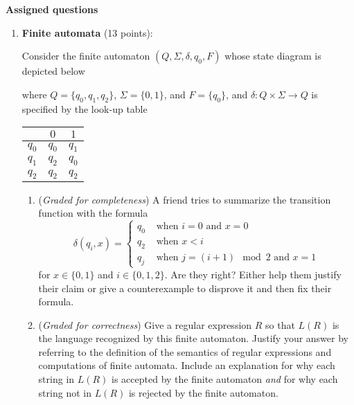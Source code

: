 \documentclass[12pt, oneside]{article}
\newcommand{\gradeCorrect}{({\it Graded for correctness}) }
\newcommand{\gradeComplete}{({\it Graded for completeness}) }
\begin{document}
{\bf Assigned questions}
\begin{enumerate}[wide, labelwidth=!, labelindent=0pt]
\item\textbf{Finite automata} (13 points):

Consider the finite automaton $(Q, \Sigma, \delta, q_0, F)$ whose state diagram is depicted below
\begin{center}
\end{center}
where $Q = \{q_0, q_1, q_2\}$, $\Sigma = \{0,1\}$, and $F = \{q_0\}$, and $\delta: Q \times \Sigma \to Q$
is specified by the look-up table
\begin{center}
\begin{tabular}{c|cc}
        & $0$ & $1$ \\
    \hline
  $q_0$ & $q_0$ & $q_1$ \\
  $q_1$ & $q_2$ & $q_0$ \\
  $q_2$ & $q_2$ & $q_2$
\end{tabular}
\end{center}
    \begin{enumerate}
    \item\gradeComplete A friend tries to summarize the transition function with the formula
    \[
        \delta(q_i,x) = \begin{cases}
            q_0 &\text{ when $i=0$ and $x=0$} \\
            q_2 &\text{ when $x < i$}\\
            q_j &\text{ when $j = (i+1) \mod 2$ and $x=1$}
        \end{cases}
    \]
    for $x \in \{0,1\}$ and $i \in \{0,1,2\}$.
    Are they right? Either help them justify their claim or give a counterexample to disprove it and then 
    fix their formula.

    \item\gradeCorrect Give a regular expression $R$ so that $L(R)$ is the language 
    recognized by this finite automaton. Justify your answer by referring to the 
    definition of the semantics of regular expressions and computations of finite automata. 
    Include an explanation for why each string in $L(R)$ is accepted by the finite automaton {\it and}
    for why each string not in $L(R)$ is rejected by the finite automaton.


\end{enumerate}
\end{enumerate}
\end{document}
